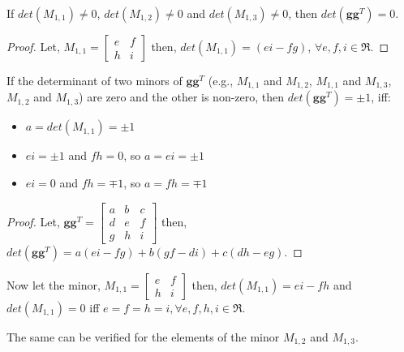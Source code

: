 \begin{otherlanguage}{english}
\begin{theorem}
If $det(M_{1,1})\neq0$, $det(M_{1,2})\neq0$ and $det(M_{1,3})\neq0$, then $det(\mathbf{gg}^{T})=0$.
\end{theorem}

\begin{proof}
Let,
$
M_{1,1} =
\begin{bmatrix}
    e & f \\
    h & i 
\end{bmatrix}
$
then, $det(M_{1,1}) = (ei - fg)$, $\forall e, f, i \in \Re$.
\end{proof}

\begin{theorem}
If the determinant of two minors of $\mathbf{gg}^{T}$ (e.g., $M_{1,1}$ and $M_{1,2}$, $M_{1,1}$ and $M_{1,3}$, $M_{1,2}$ and $M_{1,3}$) are zero and the other is non-zero, then $det(\mathbf{gg}^{T})=\pm 1$, iff:

\begin{itemize}
	\item $a = det(M_{1,1}) = \pm 1$
	\item $ei = \pm 1$ and $fh = 0$, so $a = ei = \pm 1$
	\item $ei = 0$ and $fh = \mp 1$, so $a = fh = \mp 1$
\end{itemize}
\end{theorem}

\begin{proof}
Let,
$
\mathbf{gg}^{T} =
\begin{bmatrix}
	a & b & c \\
    d & e & f \\
    g & h & i 
\end{bmatrix}
$
then, $det(\mathbf{gg}^{T}) = a(ei - fg) + b(gf - di) + c(dh - eg)$.
\end{proof}

Now let the minor,
$
M_{1,1} =
\begin{bmatrix}
    e & f \\
    h & i 
\end{bmatrix}
$
then, $det(M_{1,1}) = ei - fh$ and $det(M_{1,1}) = 0$ iff $e = f = h = i, \forall e, f, h, i \in \Re$.

The same can be verified for the elements of the minor $M_{1,2}$ and $M_{1,3}$.


\end{otherlanguage}
